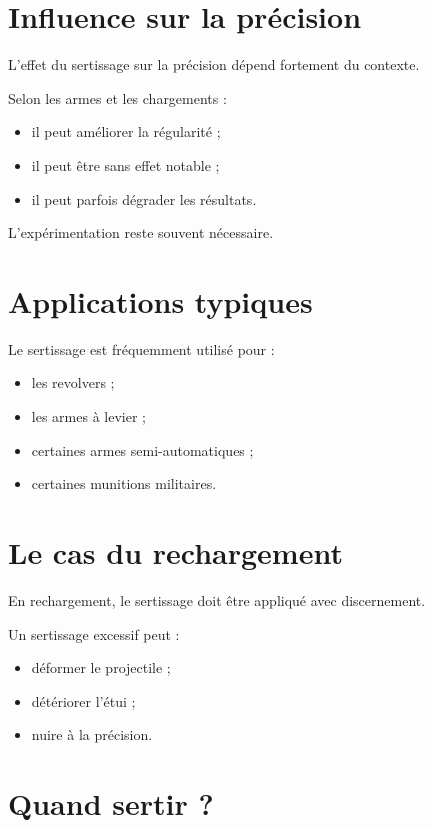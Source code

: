 \section{Influence sur la précision}

L'effet du sertissage sur la précision dépend fortement du contexte.

Selon les armes et les chargements :

\begin{itemize}
    \item il peut améliorer la régularité ;
    \item il peut être sans effet notable ;
    \item il peut parfois dégrader les résultats.
\end{itemize}

L'expérimentation reste souvent nécessaire.

\section{Applications typiques}

Le sertissage est fréquemment utilisé pour :

\begin{itemize}
    \item les revolvers ;
    \item les armes à levier ;
    \item certaines armes semi-automatiques ;
    \item certaines munitions militaires.
\end{itemize}

\section{Le cas du rechargement}

En rechargement, le sertissage doit être appliqué avec discernement.

Un sertissage excessif peut :

\begin{itemize}
    \item déformer le projectile ;
    \item détériorer l'étui ;
    \item nuire à la précision.
\end{itemize}

\section{Quand sertir ?}

